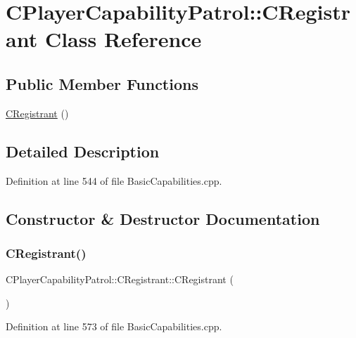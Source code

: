\hypertarget{classCPlayerCapabilityPatrol_1_1CRegistrant}{}\section{C\+Player\+Capability\+Patrol\+:\+:C\+Registrant Class Reference}
\label{classCPlayerCapabilityPatrol_1_1CRegistrant}
\subsection*{Public Member Functions}
\begin{DoxyCompactItemize}
\item 
\hyperlink{classCPlayerCapabilityPatrol_1_1CRegistrant_a30363f71e5aeed45f3953729b07829ac}{C\+Registrant} ()
\end{DoxyCompactItemize}


\subsection{Detailed Description}


Definition at line 544 of file Basic\+Capabilities.\+cpp.



\subsection{Constructor \& Destructor Documentation}
\hypertarget{classCPlayerCapabilityPatrol_1_1CRegistrant_a30363f71e5aeed45f3953729b07829ac}{}\label{classCPlayerCapabilityPatrol_1_1CRegistrant_a30363f71e5aeed45f3953729b07829ac} 
\subsubsection{\texorpdfstring{C\+Registrant()}{CRegistrant()}}
{\footnotesize\ttfamily C\+Player\+Capability\+Patrol\+::\+C\+Registrant\+::\+C\+Registrant (\begin{DoxyParamCaption}{ }\end{DoxyParamCaption})}



Definition at line 573 of file Basic\+Capabilities.\+cpp.



